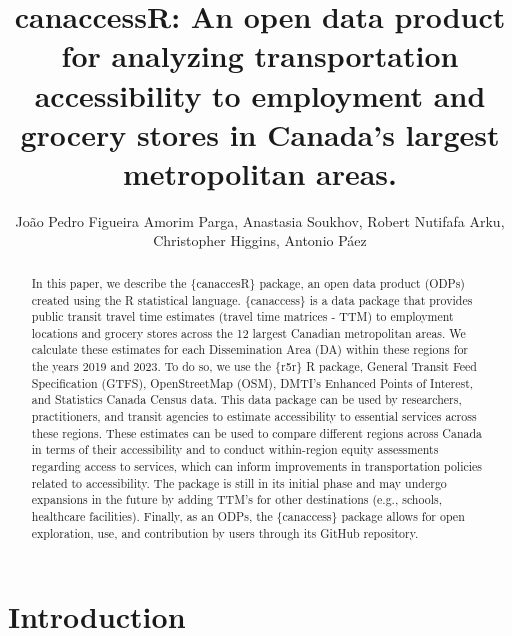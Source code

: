 \documentclass[Royal,times,sageh]{sagej}
\begin{document}

\title{canaccessR: An open data product for analyzing transportation
accessibility to employment and grocery stores in Canada's largest
metropolitan areas.}

\runninghead{}

\author{João Pedro Figueira Amorim Parga\affilnum{}, Anastasia
Soukhov\affilnum{}, Robert Nutifafa Arku\affilnum{}, Christopher
Higgins\affilnum{}, Antonio Páez\affilnum{}}

\affiliation{}



\begin{abstract}
In this paper, we describe the \{canaccesR\} package, an open data
product (ODPs) created using the R statistical language. \{canaccess\}
is a data package that provides public transit travel time estimates
(travel time matrices - TTM) to employment locations and grocery stores
across the 12 largest Canadian metropolitan areas. We calculate these
estimates for each Dissemination Area (DA) within these regions for the
years 2019 and 2023. To do so, we use the \{r5r\} R package, General
Transit Feed Specification (GTFS), OpenStreetMap (OSM), DMTI's Enhanced
Points of Interest, and Statistics Canada Census data. This data package
can be used by researchers, practitioners, and transit agencies to
estimate accessibility to essential services across these regions. These
estimates can be used to compare different regions across Canada in
terms of their accessibility and to conduct within-region equity
assessments regarding access to services, which can inform improvements
in transportation policies related to accessibility. The package is
still in its initial phase and may undergo expansions in the future by
adding TTM's for other destinations (e.g., schools, healthcare
facilities). Finally, as an ODPs, the \{canaccess\} package allows for
open exploration, use, and contribution by users through its GitHub
repository.
\end{abstract}


\maketitle

\section{Introduction}\label{introduction}
\end{document}
